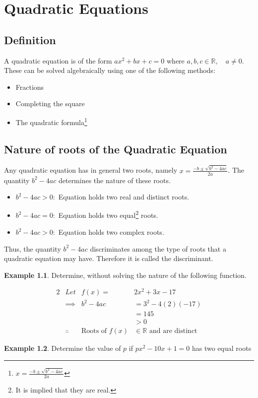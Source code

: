 \documentclass[12pt, a4paper]{report}
\newcommand*{\qe}{$x=\frac{-b\pm\sqrt{b^2-4ac}}{2a}$}
\theoremstyle{definition}
\newtheorem{example}{Example}
\begin{document}
	\chapter{Quadratic Equations}
	\section{Definition}
	\quad A quadratic equation is of the form $ax^2+bx+c=0$ where $a,b,c \in \mathbb{R},\quad a\neq0$. These can be solved algebraically using one of the following methods:
	\begin{itemize}		
		\item{Fractions}
		\item{Completing the square}
		\item{The quadratic formula\footnote[3]{\qe}}
	\end{itemize}
	\section{Nature of roots of the Quadratic Equation}
	\quad Any quadratic equation has in general two roots, namely \qe.
	The quantity $b^2-4ac$ determines the nature of these roots.
	\begin{itemize}
		\item{$b^2-4ac > 0\colon$ Equation holds two real and distinct roots.}
		\item{$b^2-4ac = 0\colon$ Equation holds two equal\footnote[4]{It is implied that they are real.} roots.}
		\item{$b^2-4ac > 0\colon$ Equation holds two complex roots.}
	\end{itemize}
	\quad Thus, the quantity $b^2-4ac$ discriminates among the type of roots that a quadratic equation may have. Therefore it is called the discriminant.
	\begin{example}
		Determine, without solving the nature of the following function.
	\end{example}
	\begin{alignat*}{2}
		& Let        & f(x) =                 & 2x^2+3x-17                              \\
		& \implies   & b^2-4ac                & =3^2-4(2)(-17)                          \\
		&            &                        & = 145                                   \\
		&            &                        & > 0                                     \\
		& \therefore & \text{Roots of $f(x)$} & \in \mathbb{R} \text{ and are distinct} 
	\end{alignat*}
	\hrulefill
	\begin{example}
		Determine the value of $p$ if $ px^2-10x+1 = 0 $ has two equal roots
	\end{example}
	
\end{document}
